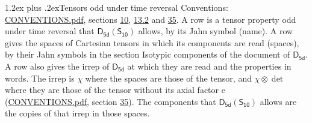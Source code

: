 \documentclass[10pt,a4paper]{article}
\makeatletter
\renewcommand\section{\@startsection{section}{1}{\z@}{-3ex plus -1ex minus -.2ex}%
  {1.2ex plus .2ex}{\normalfont\large\sffamily\bfseries\color{parttitle}}}
\numberwithin{equation}{section}
\newcommand{\grp}[1]{\mathsf{#1}}
\newcommand{\irrprod}{\otimes}
\makeatother
\begin{document}
\section{Tensors odd under time reversal}\label{s:time_odd}
Conventions: \href{../../CONVENTIONS.pdf}{CONVENTIONS.pdf}, sections \href{../../../rotation/CONVENTIONS.pdf\#conv.10}{10}, \href{../../../rotation/CONVENTIONS.pdf\#conv.13.2}{13.2} and \href{../../CONVENTIONS.pdf\#conv.35}{35}.
\leavevmode\label{n:head.name.property}A row is a tensor property odd under time reversal that $\grp{D_{5d}}(\grp{S_{10}})$ allows, by its Jahn symbol (name). \label{n:head.spaces}A row gives the spaces of Cartesian tensors in which its components are read (spaces), by their Jahn symbols in the section Isotypic components of the document of \href{../../../rotation/data/pdf/D5d.pdf}{$\grp{D_{5d}}$}. \label{n:head.properties}A row also gives the irrep of $\grp{D_{5d}}$ at which they are read and the properties in words. The irrep is $\chi$ where the spaces are those of the tensor, and $\chi \irrprod \det$ where they are those of the tensor without its axial factor e (\href{../../CONVENTIONS.pdf}{CONVENTIONS.pdf}, section \href{../../CONVENTIONS.pdf\#conv.35}{35}). The components that $\grp{D_{5d}}(\grp{S_{10}})$ allows are the copies of that irrep in those spaces.
\end{document}
